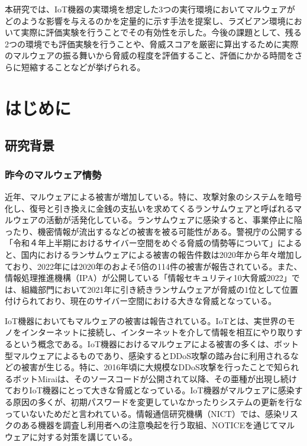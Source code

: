 \documentclass[12pt,a4paper,titlepage,report]{jsbook}
\begin{document}
本研究では、IoT機器の実環境を想定した3つの実行環境においてマルウェアがどのような影響を与えるのかを定量的に示す手法を提案し、ラズビアン環境において実際に評価実験を行うことでその有効性を示した。今後の課題として、残る2つの環境でも評価実験を行うことや、脅威スコアを厳密に算出するために実際のマルウェアの振る舞いから脅威の程度を評価すること、評価にかかる時間をさらに短縮することなどが挙げられる。



\tableofcontents
\listoffigures
\listoftables
\newpage


\pagestyle{plain}




\chapter{はじめに}
\section{研究背景}
\subsection{昨今のマルウェア情勢}
近年、マルウェアによる被害が増加している。特に、攻撃対象のシステムを暗号化し、復号と引き換えに金銭の支払いを求めてくるランサムウェアと呼ばれるマルウェアの活動が活発化している。ランサムウェアに感染すると、事業停止に陥ったり、機密情報が流出するなどの被害を被る可能性がある。警視庁の公開する「令和４年上半期におけるサイバー空間をめぐる脅威の情勢等について」\cite{policereport}によると、国内におけるランサムウェアによる被害の報告件数は2020年から年々増加しており、2022年には2020年のおよそ5倍の114件の被害が報告されている。また、情報処理推進機構（IPA）が公開している「情報セキュリティ10大脅威2022」\cite{bestthreat2022}では、組織部門において2021年に引き続きランサムウェアが脅威の1位として位置付けられており、現在のサイバー空間における大きな脅威となっている。

IoT機器においてもマルウェアの被害は報告されている。IoTとは、実世界のモノをインターネットに接続し、インターネットを介して情報を相互にやり取りするという概念である。IoT機器におけるマルウェアによる被害の多くは、ボット型マルウェアによるものであり、感染するとDDoS攻撃の踏み台に利用されるなどの被害が生じる。特に、2016年頃に大規模なDDoS攻撃を行ったことで知られるボットMiraiは、そのソースコードが公開されて以降、その亜種が出現し続けておりIoT機器にとって大きな脅威となっている\cite{malwaresurvey}。IoT機器がマルウェアに感染する原因の多くが、初期パスワードを変更していなかったりシステムの更新を行なっていないためだと言われている。情報通信研究機構（NICT）では、感染リスクのある機器を調査し利用者への注意喚起を行う取組、NOTICE\cite{notice}を通じてマルウェアに対する対策を講じている。
\end{document}
